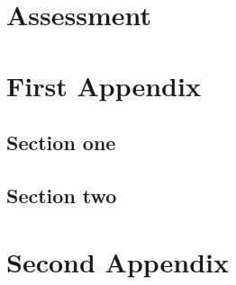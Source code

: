 \documentclass[doublespace,draft,nopageskip]{VTthesis} %
\begin{document}
    \chapter{Assessment} \label{ch:assessment}
        


	\appendix

	\begin{appendices}
		\chapter{First Appendix} \label{app:appendix_one}
			\section{Section one} \label{ase:app_one_sect_1}
			\section{Section two} \label{ase:app_one_sect_2}
		\chapter{Second Appendix} \label{app:appendix_two}
	\end{appendices}
\end{document}
